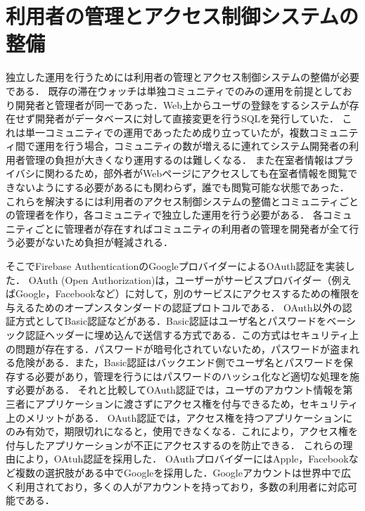 

\section{利用者の管理とアクセス制御システムの整備}\label{4.2}
独立した運用を行うためには利用者の管理とアクセス制御システムの整備が必要である．
既存の滞在ウォッチは単独コミュニティでのみの運用を前提としており開発者と管理者が同一であった．Web上からユーザの登録をするシステムが存在せず開発者がデータベースに対して直接変更を行うSQLを発行していた．
これは単一コミュニティでの運用であったため成り立っていたが，複数コミュニティ間で運用を行う場合，コミュニティの数が増えるに連れてシステム開発者の利用者管理の負担が大きくなり運用するのは難しくなる．
また在室者情報はプライバシに関わるため，部外者がWebページにアクセスしても在室者情報を閲覧できないようにする必要があるにも関わらず，誰でも閲覧可能な状態であった．
これらを解決するには利用者のアクセス制御システムの整備とコミュニティごとの管理者を作り，各コミュニティで独立した運用を行う必要がある．
各コミュニティごとに管理者が存在すればコミュニティの利用者の管理を開発者が全て行う必要がないため負担が軽減される．


そこでFirebase AuthenticationのGoogleプロバイダーによるOAuth認証を実装した．
OAuth (Open Authorization)は，ユーザーがサービスプロバイダー（例えばGoogle，Facebookなど）に対して，別のサービスにアクセスするための権限を与えるためのオープンスタンダードの認証プロトコルである．
OAuth以外の認証方式としてBasic認証などがある．Basic認証はユーザ名とパスワードをベーシック認証ヘッダーに埋め込んで送信する方式である．この方式はセキュリティ上の問題が存在する．パスワードが暗号化されていないため，パスワードが盗まれる危険がある．また，Basic認証はバックエンド側でユーザ名とパスワードを保存する必要があり，管理を行うにはパスワードのハッシュ化など適切な処理を施す必要がある．
それと比較してOAuth認証では，ユーザのアカウント情報を第三者にアプリケーションに渡さずにアクセス権を付与できるため，セキュリティ上のメリットがある．
OAuth認証では，アクセス権を持つアプリケーションにのみ有効で，期限切れになると，使用できなくなる．これにより，アクセス権を付与したアプリケーションが不正にアクセスするのを防止できる．
これらの理由により，OAtuh認証を採用した．
OAuthプロバイダーにはApple，Facebookなど複数の選択肢がある中でGoogleを採用した．Googleアカウントは世界中で広く利用されており，多くの人がアカウントを持っており，多数の利用者に対応可能である．

